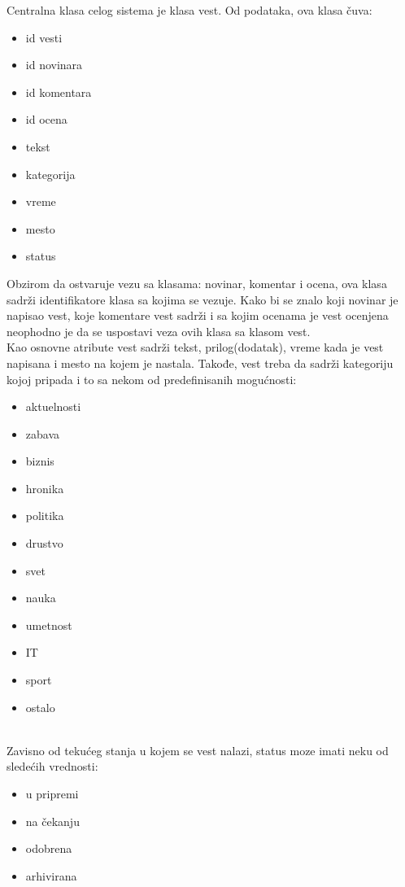 \documentclass{article}
\begin{document}
Centralna klasa celog sistema je klasa vest. Od podataka, ova klasa čuva:

\begin{itemize}
    \item id vesti
    \item id novinara
    \item id komentara
    \item id ocena
    \item tekst
    \item kategorija
    \item vreme
    \item mesto
    \item status
\end{itemize}

Obzirom da ostvaruje vezu sa klasama: novinar, komentar i ocena, ova klasa sadrži identifikatore klasa sa kojima se vezuje. Kako bi se znalo koji novinar je napisao vest, koje komentare vest sadrži i sa kojim ocenama je vest ocenjena neophodno je da se uspostavi veza ovih klasa sa klasom vest. \\
Kao osnovne atribute vest sadrži tekst, prilog(dodatak), vreme kada je vest napisana i mesto na kojem je nastala. Takođe, vest treba da sadrži kategoriju kojoj pripada i to sa nekom od predefinisanih mogućnosti:

\begin{itemize}
    \item aktuelnosti
    \item zabava
    \item biznis
    \item hronika
    \item politika
    \item drustvo
    \item svet
    \item nauka
    \item umetnost
    \item IT
    \item sport
    \item ostalo  
\end{itemize}

\  \\

\indent Zavisno od tekućeg stanja u kojem se vest nalazi, status moze imati neku od sledećih vrednosti:
\begin{itemize}
    \item u pripremi
    \item na čekanju
    \item odobrena
    \item arhivirana
\end{itemize}
\end{document}
